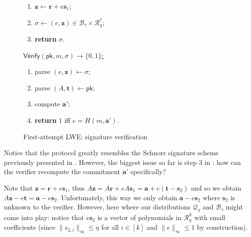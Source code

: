 \documentclass{template}
\begin{document}
\begin{figure}[ht]
\begin{minipage}[t]{0.32\linewidth}
\begin{mdframed}[linecolor=black, linewidth=1.0pt,
                     skipabove=5pt, skipbelow=5pt,
                     innerleftmargin=5pt, innerrightmargin=5pt]
\begin{enumerate}
            \item $\mathbf{z} \gets \mathbf{r} + e\mathbf{s}_1$; 
            \item $\sigma \gets (e,\mathbf{z}) \in \mathcal{B}_{\tau} \times \mathcal{R}_q^{\ell}$;
            \item \textbf{return} $\sigma$.
        \end{enumerate}
    \end{mdframed}
    \caption{First-attempt LWE: signing} 
    \label{fig:first-attempt-sign}
\end{minipage}
\hfill
\begin{minipage}[t]{0.32\linewidth}
    \begin{mdframed}[linecolor=black, linewidth=1.0pt,
                     skipabove=5pt, skipbelow=5pt,
                     innerleftmargin=5pt, innerrightmargin=5pt]
        \centering
        \colorbox{green!10}{\underline{$\mathsf{Verify}(\mathsf{pk}, m, \sigma) \to \{0,1\}$:}}
        \begin{enumerate}
            \item parse $(e, \mathbf{z}) \gets \sigma$;
            \item parse $(A,\mathbf{t}) \gets \mathsf{pk}$;
            \item compute $\mathbf{a}'$;
            \item \textbf{return} $1$ iff $e=H(m,\mathbf{a}')$.
        \end{enumerate}
    \end{mdframed}
    \caption{First-attempt LWE: signature verification}
    \label{fig:first-attempt-verify}
\end{minipage}
\end{figure}

Notice that the protocol greatly resembles the Schnorr signature scheme
previously presented in . However, the biggest issue so far is
step 3 in : how can the verifier recompute the
commitment $\mathbf{a}'$ specifically?

Note that $\mathbf{z} = \mathbf{r} + e\mathbf{s}_1$, thus $A\mathbf{z} =
A\mathbf{r} + eA\mathbf{s}_1 = \mathbf{a} + e(\mathbf{t}-\mathbf{s}_2)$ and so
we obtain $A\mathbf{z} - e\mathbf{t} = \mathbf{a} - e\mathbf{s}_2$.
Unfortunately, this way we only obtain $\mathbf{a}-e\mathbf{s}_2$ where
$\mathbf{s}_2$ is unknown to the verifier. However, here where our distributions
$\mathcal{Q}_{\eta}$ and $\mathcal{B}_{\tau}$ might come into play: notice that
$e\mathbf{s}_2$ is a vector of polynomials in $\mathcal{R}_q^k$ with small
coefficients (since $\|s_{2,i}\|_{\infty} \leq \eta$ for all $i \in [k]$ and
$\|e\|_{\infty} \leq 1$ by construction).
\end{document}
